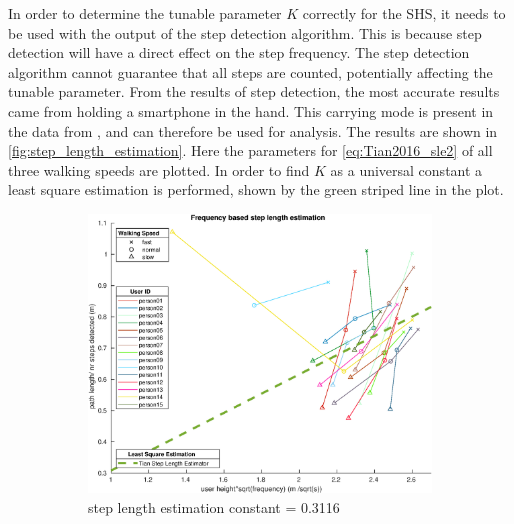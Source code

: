 In order to determine the tunable parameter $K$ correctly for the SHS, it needs to be used with the output of the step detection algorithm. This is because step detection will have a direct effect on the step frequency. The step detection algorithm cannot guarantee that all steps are counted, potentially affecting the tunable parameter. 
From the results of step detection, the most accurate results came from holding a smartphone in the hand. This carrying mode is present in the data from \cite{Vezocnik2019}, and can therefore be used for analysis. The results are shown in \cref{fig:step_length_estimation}. Here the parameters for \cref{eq:Tian2016_sle2} of all three walking speeds are plotted. In order to find $K$ as a universal constant a least square estimation is performed, shown by the green striped line in the plot.
\begin{figure}[H]
	\centering
	\begin{subfigure}[t]{.45\textwidth}
	\centering
	\includegraphics[width=\linewidth]{images/20201028_1050_step_length_all_data}
	\caption{step length estimation constant = 0.3116}
	\label{fig:step_length_all_data}
	\end{subfigure}
	\begin{subfigure}[t]{.45\textwidth}
		\centering

\end{subfigure}
\end{figure}
